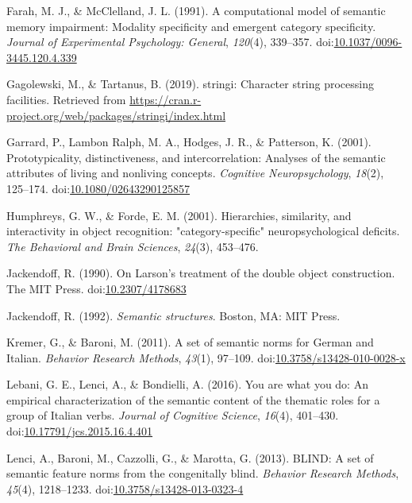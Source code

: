 \documentclass[man]{apa6}
\begin{document}
\leavevmode\hypertarget{ref-Farah1991}{}%
Farah, M. J., \& McClelland, J. L. (1991). A computational model of semantic memory impairment: Modality specificity and emergent category specificity. \emph{Journal of Experimental Psychology: General}, \emph{120}(4), 339--357. doi:\href{https://doi.org/10.1037/0096-3445.120.4.339}{10.1037/0096-3445.120.4.339}

\leavevmode\hypertarget{ref-Gagolewski2019}{}%
Gagolewski, M., \& Tartanus, B. (2019). stringi: Character string processing facilities. Retrieved from \url{https://cran.r-project.org/web/packages/stringi/index.html}

\leavevmode\hypertarget{ref-Garrard2001}{}%
Garrard, P., Lambon Ralph, M. A., Hodges, J. R., \& Patterson, K. (2001). Prototypicality, distinctiveness, and intercorrelation: Analyses of the semantic attributes of living and nonliving concepts. \emph{Cognitive Neuropsychology}, \emph{18}(2), 125--174. doi:\href{https://doi.org/10.1080/02643290125857}{10.1080/02643290125857}

\leavevmode\hypertarget{ref-Humphreys2001}{}%
Humphreys, G. W., \& Forde, E. M. (2001). Hierarchies, similarity, and interactivity in object recognition: "category-specific" neuropsychological deficits. \emph{The Behavioral and Brain Sciences}, \emph{24}(3), 453--476.

\leavevmode\hypertarget{ref-Jackendoff}{}%
Jackendoff, R. (1990). On Larson's treatment of the double object construction. The MIT Press. doi:\href{https://doi.org/10.2307/4178683}{10.2307/4178683}

\leavevmode\hypertarget{ref-Jackendoff1992}{}%
Jackendoff, R. (1992). \emph{Semantic structures}. Boston, MA: MIT Press.

\leavevmode\hypertarget{ref-Kremer2011a}{}%
Kremer, G., \& Baroni, M. (2011). A set of semantic norms for German and Italian. \emph{Behavior Research Methods}, \emph{43}(1), 97--109. doi:\href{https://doi.org/10.3758/s13428-010-0028-x}{10.3758/s13428-010-0028-x}

\leavevmode\hypertarget{ref-Lebani2016}{}%
Lebani, G. E., Lenci, A., \& Bondielli, A. (2016). You are what you do: An empirical characterization of the semantic content of the thematic roles for a group of Italian verbs. \emph{Journal of Cognitive Science}, \emph{16}(4), 401--430. doi:\href{https://doi.org/10.17791/jcs.2015.16.4.401}{10.17791/jcs.2015.16.4.401}

\leavevmode\hypertarget{ref-Lenci2013}{}%
Lenci, A., Baroni, M., Cazzolli, G., \& Marotta, G. (2013). BLIND: A set of semantic feature norms from the congenitally blind. \emph{Behavior Research Methods}, \emph{45}(4), 1218--1233. doi:\href{https://doi.org/10.3758/s13428-013-0323-4}{10.3758/s13428-013-0323-4}
\end{document}
